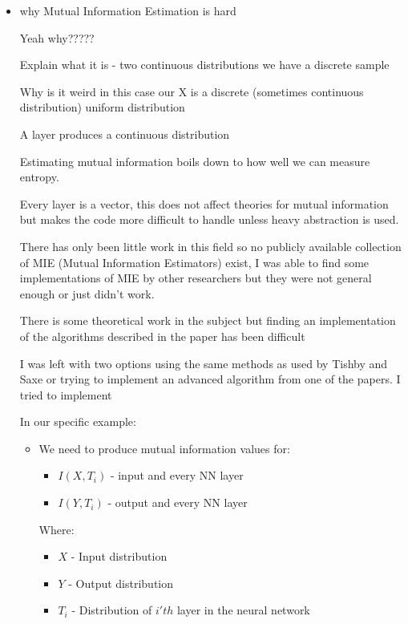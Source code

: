 \begin{itemize}
  \item{
      why Mutual Information Estimation is hard

      Yeah why?????

      Explain what it is - two continuous distributions we have a discrete
      sample 

      Why is it weird in this case
      our X is a discrete (sometimes continuous distribution) uniform
      distribution 

      A layer produces a continuous distribution

      Estimating mutual information boils down to how well we can measure
      entropy.

      Every layer is a vector, this does not affect theories for mutual
      information but makes the code more difficult to handle unless heavy
      abstraction is used.

      There has only been little work in this field so no publicly available
      collection of MIE (Mutual Information Estimators) exist, I was able to
      find some implementations of MIE by other researchers but they were not
      general enough or just didn't work. 

      There is some theoretical work in the subject but finding an
      implementation of the algorithms described in the paper has been difficult

      I was left with two options using the same methods as used by Tishby and
      Saxe or trying to implement an advanced algorithm from one of the papers.
      I tried to implement 

      In our specific example:
      \begin{itemize}
        \item{
            We need to produce mutual information values for:
            \begin{itemize}
              \item{
                  $I(X, T_i)$ - input and every NN layer
                }
              \item{
                  $I(Y, T_i)$ - output and every NN layer
                }
            \end{itemize}

            Where:

            \begin{itemize}
              \item{
                  $X$ - Input distribution
                }
              \item{
                  $Y$ - Output distribution
                }
              \item{
                  $T_i$ - Distribution of $i'th$ layer in the neural network
                }
            \end{itemize}

}
\end{itemize}}
\end{itemize}
